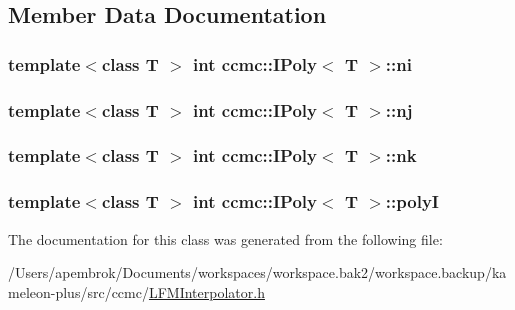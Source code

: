 \subsection{Member Data Documentation}
\hypertarget{classccmc_1_1_i_poly_acc18cf8374b6dc4b5f7ba6d618b63450}{
\subsubsection[{ni}]{\setlength{\rightskip}{0pt plus 5cm}template$<$class T $>$ int {\bf ccmc\-::\-I\-Poly}$<$ T $>$\-::ni}}\label{classccmc_1_1_i_poly_acc18cf8374b6dc4b5f7ba6d618b63450}
\hypertarget{classccmc_1_1_i_poly_a83b93fc10fc608cde13d8750630e5e8a}{
\subsubsection[{nj}]{\setlength{\rightskip}{0pt plus 5cm}template$<$class T $>$ int {\bf ccmc\-::\-I\-Poly}$<$ T $>$\-::nj}}\label{classccmc_1_1_i_poly_a83b93fc10fc608cde13d8750630e5e8a}
\hypertarget{classccmc_1_1_i_poly_a374a6273e608cf09d71173baf4e3593b}{
\subsubsection[{nk}]{\setlength{\rightskip}{0pt plus 5cm}template$<$class T $>$ int {\bf ccmc\-::\-I\-Poly}$<$ T $>$\-::nk}}\label{classccmc_1_1_i_poly_a374a6273e608cf09d71173baf4e3593b}
\hypertarget{classccmc_1_1_i_poly_a2b001122fdcd1d21eae47e24f4ba7f0e}{
\subsubsection[{poly\-I}]{\setlength{\rightskip}{0pt plus 5cm}template$<$class T $>$ int {\bf ccmc\-::\-I\-Poly}$<$ T $>$\-::poly\-I}}\label{classccmc_1_1_i_poly_a2b001122fdcd1d21eae47e24f4ba7f0e}


The documentation for this class was generated from the following file\-:\begin{DoxyCompactItemize}
\item 
/\-Users/apembrok/\-Documents/workspaces/workspace.\-bak2/workspace.\-backup/kameleon-\/plus/src/ccmc/\hyperlink{_l_f_m_interpolator_8h}{L\-F\-M\-Interpolator.\-h}\end{DoxyCompactItemize}
